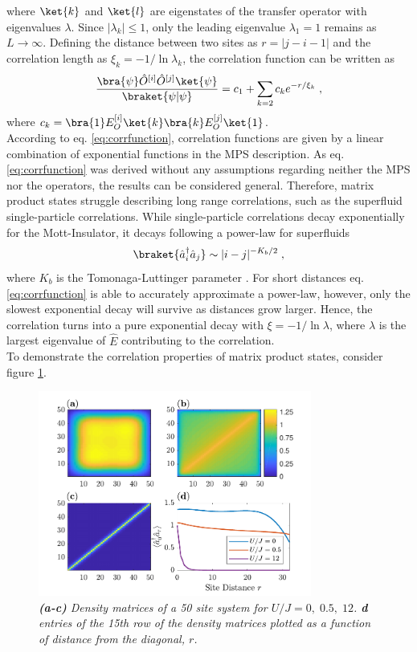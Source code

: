 where $\ket{k}$ and $\ket{l}$ are eigenstates of the transfer operator with eigenvalues $\lambda$. Since $|\lambda_k| \leq 1 $, only the leading eigenvalue $\lambda_1 = 1$ remains as $L \to \infty$. Defining the distance between two sites as $r = |j - i -1|$ and the correlation  length as $\xi_k = -1/\ln \lambda_k$, the correlation function can be written as
\begin{equation}
	\frac{\bra{\psi} \hat{O}^{[i]} \hat{O}^{[j]} \ket{\psi}}{\braket{\psi | \psi}} = c_1 + \sum_{k = 2} c_k e^{-r/ \xi_k} \; , \label{eq:corrfunction}
\end{equation}
where $c_k = \bra{1} E_{O}^{[i]} \ket{k} \bra{k} E_{O}^{[j]} \ket{1}$. \cite{schollwock} \\
According to eq. \eqref{eq:corrfunction}, correlation functions are given by a linear combination of exponential functions in the MPS description. As eq. \eqref{eq:corrfunction} was derived without any assumptions regarding neither the MPS nor the operators, the results can be considered general. Therefore, matrix product states struggle describing long range correlations, such as the superfluid single-particle correlations. While single-particle correlations decay exponentially for the Mott-Insulator, it decays following a power-law for superfluids
\begin{equation}
	\braket{\hat{a}_{i}^{\dag} \hat{a}_{j}} \sim |i - j|^{-K_b /2} \; ,
	\label{eq:superfluidCorrelation}
\end{equation}
where $K_b$ is the Tomonaga-Luttinger parameter \cite{characPhases}. For short distances eq. \eqref{eq:corrfunction} is able to accurately approximate a power-law, however, only the slowest exponential decay will survive as distances grow larger. Hence, the correlation turns into a pure exponential decay with $\xi = -1/ \ln \lambda$, where $\lambda$ is the largest eigenvalue of $\hat{E}$ contributing to the correlation.\\
To demonstrate the correlation properties of matrix product states, consider figure \ref{fig:DensityMatrices}.
\begin{figure}[h!]
    \centering
    \includegraphics[width=0.8\textwidth]{Figures/DensityMatrices.pdf}
    \caption{\textit{\textbf{(a-c)} Density matrices of a 50 site system for $U/J = 0, \; 0.5, \; 12$. \textbf{d} entries of the 15th row of the density matrices plotted as a function of distance from the diagonal, $r$. }}
    \label{fig:DensityMatrices}
\end{figure}
